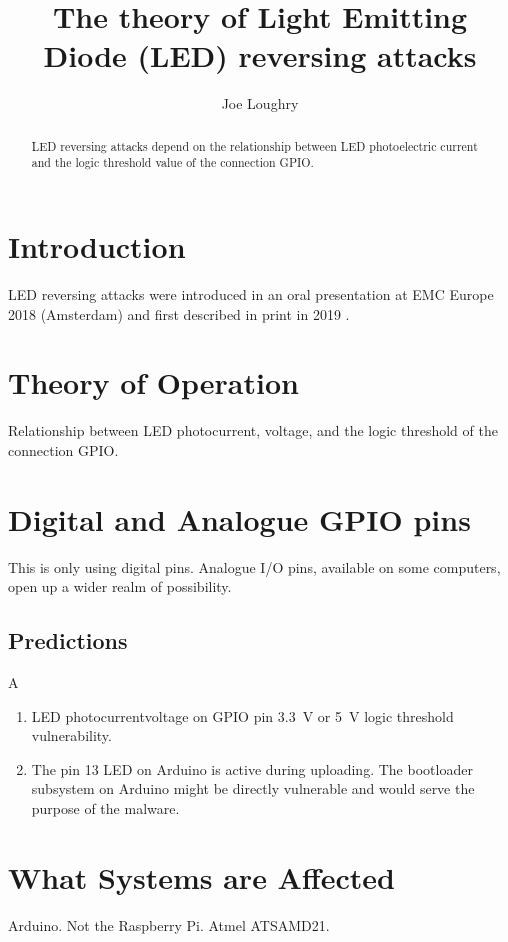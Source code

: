 \documentclass[a4paper,notitlepage]{article}
\begin{document}
\title{The theory of Light Emitting Diode (LED) reversing attacks}
\author{Joe Loughry}
\maketitle
\begin{abstract}
  LED reversing attacks depend on the relationship between LED photoelectric
  current and the logic threshold value of the connection GPIO.
\end{abstract}
\maketitle
\section{Introduction}
LED reversing attacks were introduced in an oral presentation at EMC Europe
2018 (Amsterdam) and first described in print in 2019 \cite{Loughry2019}.
\section{Theory of Operation}
Relationship between LED photocurrent, voltage, and the logic threshold of the
connection GPIO.
\section{Digital and Analogue GPIO pins}
This is only using digital pins. Analogue I/O pins, available on some
computers, open up a wider realm of possibility.
\subsection{Predictions}A
\begin{enumerate}
  \item LED photocurrent\textrightarrow voltage on GPIO pin\textrightarrow
    \SI{3.3}{\volt} or \SI{5}{\volt} logic threshold\textrightarrow
    vulnerability.
  \item The pin 13 LED on Arduino is active during uploading. The bootloader
    subsystem on Arduino might be directly vulnerable and would serve the
    purpose of the malware.
\end{enumerate}
\section{What Systems are Affected}
Arduino. Not the Raspberry Pi. Atmel ATSAMD21.
\end{document}
